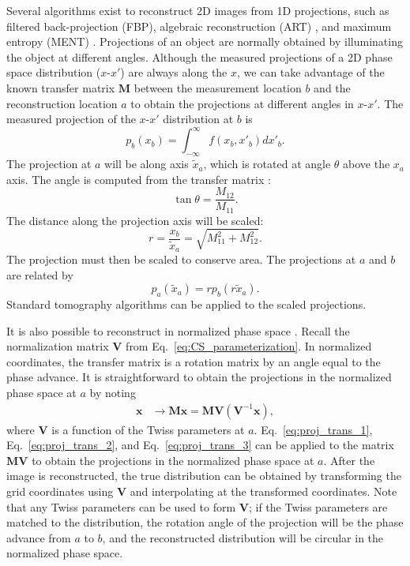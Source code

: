Several algorithms exist to reconstruct 2D images from 1D projections, such as filtered back-projection (FBP), algebraic reconstruction (ART) \cite{Slaney1988}, and maximum entropy (MENT) \cite{Minerbo1979}. Projections of an object are normally obtained by illuminating the object at different angles. Although the measured projections of a 2D phase space distribution ($x$-$x'$) are always along the $x$, we can take advantage of the known transfer matrix $\mathbf{M}$ between the measurement location $b$ and the reconstruction location $a$ to obtain the projections at different angles in $x$-$x'$. The measured projection of the $x$-$x'$ distribution at $b$ is
%
\begin{equation}
    p_b(x_b) = \int_{-\infty}^{\infty} f(x_b, x'_b) dx'_b.
\end{equation}
%
The projection at $a$ will be along axis $\tilde{x}_a$, which is rotated at angle $\theta$ above the $x_a$ axis. The angle is computed from the transfer matrix \cite{Hock2013a}:
%
\begin{equation}\label{eq:proj_trans_1}
    \tan\theta = \frac{M_{12}}{M_{11}}.
\end{equation}
%
The distance along the projection axis will be scaled:
%
\begin{equation}\label{eq:proj_trans_2}
    r = \frac{x_b}{\tilde{x}_a} = \sqrt{M_{11}^2 + M_{12}^2}.
\end{equation}
%
The projection must then be scaled to conserve area. The projections at $a$ and $b$ are related by 
%
\begin{equation}\label{eq:proj_trans_3}
    p_a(\tilde{x}_a) = r p_b(r \tilde{x}_a).
\end{equation}
%
Standard tomography algorithms can be applied to the scaled projections.

It is also possible to reconstruct in normalized phase space \cite{Hock2011}. Recall the normalization matrix $\mathbf{V}$ from Eq.~\eqref{eq:CS_parameterization}. In normalized coordinates, the transfer matrix is a rotation matrix by an angle equal to the phase advance. It is straightforward to obtain the projections in the normalized phase space at $a$ by noting
%
\begin{equation}
\begin{aligned}
    \mathbf{x} &\rightarrow \mathbf{M} \mathbf{x}
    = \mathbf{M} \mathbf{V} (\mathbf{V}^{-1} \mathbf{x})
    ,
\end{aligned}
\end{equation}
%
where $\mathbf{V}$ is a function of the Twiss parameters at $a$. Eq.~\eqref{eq:proj_trans_1}, Eq.~\eqref{eq:proj_trans_2}, and Eq.~\eqref{eq:proj_trans_3} can be applied to the matrix $\mathbf{M} \mathbf{V}$ to obtain the projections in the normalized phase space at $a$. After the image is reconstructed, the true distribution can be obtained by transforming the grid coordinates using $\mathbf{V}$ and interpolating at the transformed coordinates. Note that any Twiss parameters can be used to form $\mathbf{V}$; if the Twiss parameters are matched to the distribution, the rotation angle of the projection will be the phase advance from $a$ to $b$, and the reconstructed distribution will be circular in the normalized phase space. 


